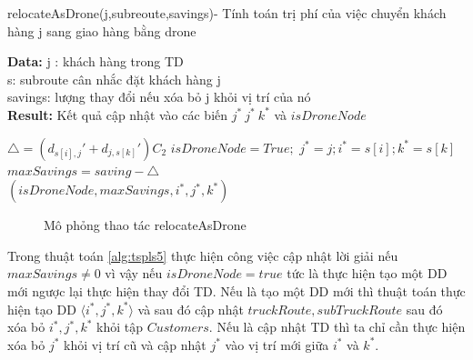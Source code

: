 \documentclass[a4paper,12pt]{report}
\begin{document}
\begin{algorithm}[H]
\caption{relocateAsDrone(j,subreoute,savings)- Tính toán trị phí của việc chuyển khách hàng j sang giao hàng bằng drone}
\textbf{Data:} j : khách hàng trong TD\\ s: subroute cân nhắc đặt khách hàng j \\ savings: lượng thay đổi nếu xóa bỏ j khỏi vị trí của nó\\

\textbf{Result:} Kết quả cập nhật vào các biến $j^* \ j^* \ k^*$ và $isDroneNode$
\begin{algorithmic}[1]
\State$\triangle =(d_{s[i],j}'+d_{j,s[k]}')C_2$
\State $isDroneNode=True;$
\State  $j^*=j;i^*=s[i];k^*=s[k]$
\State $maxSavings=saving-\triangle$
\EndIf
\EndIf
\EndFor
\EndFor\\
\Return 	$(isDroneNode,maxSavings,i^*,j^*,k^*)$
\end{algorithmic}

\label{alg:tspls4}
\end{algorithm}
\begin{figure}[H]

\caption{Mô phỏng thao tác relocateAsDrone}\label{reloAsDrone}
\end{figure}
Trong thuật toán \ref{alg:tspls5} thực hiện công việc cập nhật lời giải nếu $maxSavings \neq 0$ vì vậy nếu $isDroneNode=true $ tức là thực hiện tạo một DD mới ngược lại thực hiện thay đổi TD. Nếu là tạo một DD mới thì thuật toán thực hiện tạo DD $\langle i^*,j^*,k^* \rangle$ và sau đó cập nhật $truckRoute,subTruckRoute$ sau đó xóa bỏ $i^*,j^*,k^*$ khỏi tập $Customers$. Nếu là cập nhật TD thì ta chỉ cần thực hiện xóa bỏ $j^*$ khỏi vị trí cũ và cập nhật $j^*$ vào vị trí mới giữa $i^*$ và $k^*$. \\
\end{document}
